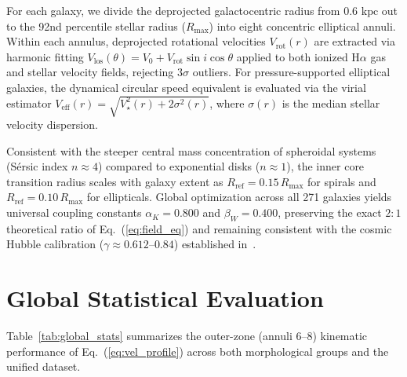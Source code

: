 \documentclass[11pt,a4paper]{article}
\begin{document}
For each galaxy, we divide the deprojected galactocentric radius from $0.6\text{ kpc}$ out to the 92nd percentile stellar radius ($R_{\max}$) into eight concentric elliptical annuli. Within each annulus, deprojected rotational velocities $V_{\mathrm{rot}}(r)$ are extracted via harmonic fitting $V_{\mathrm{los}}(\theta) = V_0 + V_{\mathrm{rot}}\sin i \cos\theta$ applied to both ionized H$\alpha$ gas and stellar velocity fields, rejecting $3\sigma$ outliers. For pressure-supported elliptical galaxies, the dynamical circular speed equivalent is evaluated via the virial estimator $V_{\mathrm{eff}}(r) = \sqrt{V_{\star}^2(r) + 2\sigma^2(r)}$, where $\sigma(r)$ is the median stellar velocity dispersion.

Consistent with the steeper central mass concentration of spheroidal systems (S\'ersic index $n \approx 4$) compared to exponential disks ($n \approx 1$), the inner core transition radius scales with galaxy extent as $R_{\mathrm{ref}} = 0.15\,R_{\max}$ for spirals and $R_{\mathrm{ref}} = 0.10\,R_{\max}$ for ellipticals. Global optimization across all 271 galaxies yields universal coupling constants $\alpha_K = 0.800$ and $\beta_W = 0.400$, preserving the exact $2:1$ theoretical ratio of Eq.~(\ref{eq:field_eq}) and remaining consistent with the cosmic Hubble calibration ($\gamma \approx 0.612\text{--}0.84$) established in~\cite{Takacs2026}.

\section{Global Statistical Evaluation}

Table~\ref{tab:global_stats} summarizes the outer-zone (annuli 6--8) kinematic performance of Eq.~(\ref{eq:vel_profile}) across both morphological groups and the unified dataset.

\begin{table}[htbp]
	\centering
	\caption{Outer-zone velocity anomaly ratios ($V/V_{\mathrm{Kep}}$) and model accuracy across the 271 SDSS MaNGA galaxies.}
	\label{tab:global_stats}
\end{table}
\end{document}
